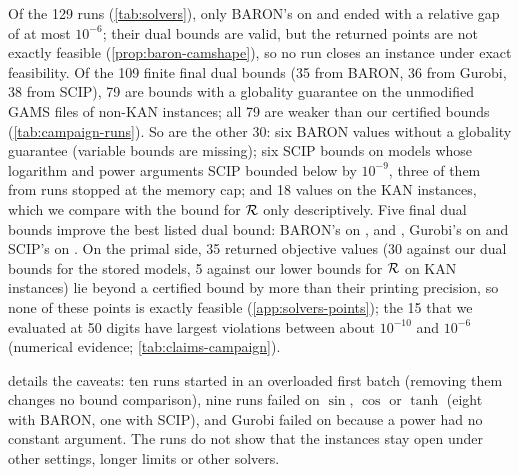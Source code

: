 Of the 129 runs (\cref{tab:solvers}), only BARON's on  and  ended with a relative gap of at most $10^{-6}$; their dual bounds are valid, but the returned points are not exactly feasible (\cref{prop:baron-camshape}), so no run closes an instance under exact feasibility.
Of the 109 finite final dual bounds (35 from BARON, 36 from Gurobi, 38 from SCIP), 79 are bounds with a globality guarantee on the unmodified GAMS files of non-KAN instances; all 79 are weaker than our certified bounds (\cref{tab:campaign-runs}).
So are the other 30: six BARON values without a globality guarantee (variable bounds are missing); six SCIP bounds on models whose logarithm and power arguments SCIP bounded below by $10^{-9}$, three of them from runs stopped at the memory cap; and 18 values on the KAN instances, which we compare with the bound for $\mathcal{R}$ only descriptively.
Five final dual bounds improve the best listed dual bound: BARON's on ,  and , Gurobi's on  and SCIP's on .
On the primal side, 35 returned objective values (30 against our dual bounds for the stored models, 5 against our lower bounds for $\mathcal{R}$ on KAN instances) lie beyond a certified bound by more than their printing precision, so none of these points is exactly feasible (\cref{app:solvers-points}); the 15 that we evaluated at 50 digits have largest violations between about $10^{-10}$ and $10^{-6}$ (numerical evidence; \cref{tab:claims-campaign}).

 details the caveats: ten runs started in an overloaded first batch (removing them changes no bound comparison), nine runs failed on $\sin$, $\cos$ or $\tanh$ (eight with BARON, one with SCIP), and Gurobi failed on  because a power had no constant argument.
The runs do not show that the instances stay open under other settings, longer limits or other solvers.
